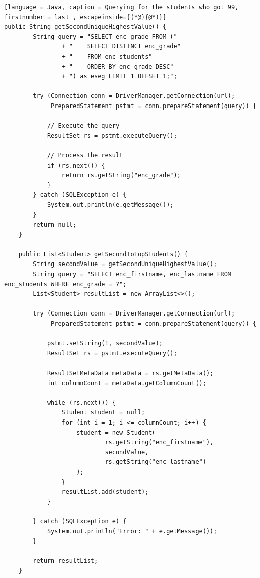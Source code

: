 \begin{lstlisting}[language = Java, caption = Querying for the students who got 99, firstnumber = last , escapeinside={(*@}{@*)}]
public String getSecondUniqueHighestValue() {
        String query = "SELECT enc_grade FROM ("
                + "    SELECT DISTINCT enc_grade"
                + "    FROM enc_students"
                + "    ORDER BY enc_grade DESC"
                + ") as eseg LIMIT 1 OFFSET 1;";

        try (Connection conn = DriverManager.getConnection(url);
             PreparedStatement pstmt = conn.prepareStatement(query)) {

            // Execute the query
            ResultSet rs = pstmt.executeQuery();

            // Process the result
            if (rs.next()) {
                return rs.getString("enc_grade");
            }
        } catch (SQLException e) {
            System.out.println(e.getMessage());
        }
        return null;
    }

    public List<Student> getSecondToTopStudents() {
        String secondValue = getSecondUniqueHighestValue();
        String query = "SELECT enc_firstname, enc_lastname FROM enc_students WHERE enc_grade = ?";
        List<Student> resultList = new ArrayList<>();

        try (Connection conn = DriverManager.getConnection(url);
             PreparedStatement pstmt = conn.prepareStatement(query)) {

            pstmt.setString(1, secondValue);
            ResultSet rs = pstmt.executeQuery();

            ResultSetMetaData metaData = rs.getMetaData();
            int columnCount = metaData.getColumnCount();

            while (rs.next()) {
                Student student = null;
                for (int i = 1; i <= columnCount; i++) {
                    student = new Student(
                            rs.getString("enc_firstname"),
                            secondValue,
                            rs.getString("enc_lastname")
                    );
                }
                resultList.add(student);
            }

        } catch (SQLException e) {
            System.out.println("Error: " + e.getMessage());
        }

        return resultList;
    }
\end{lstlisting}


